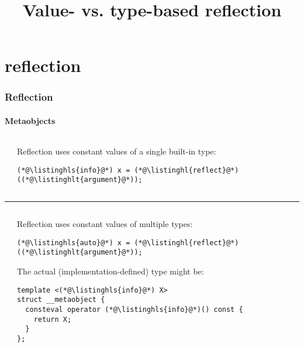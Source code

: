 \documentclass[compress,table,xcolor=table]{beamer}
\begin{document}
\title{Value- vs. type-based reflection}
\section{reflection}
\begin{frame}[fragile]
  \frametitle{Reflection}
  \framesubtitle{Metaobjects}
  \begin{columns}
    \begin{column}{.05\textwidth}
    \end{column}
    \begin{column}{.85\textwidth}
    \normalsize
    Reflection uses constant values of a single built-in type:
    \begin{lstlisting}[language=c++2x,basicstyle=\normalsize\ttfamily]
(*@\listinghls{info}@*) x = (*@\listinghl{reflect}@*)((*@\listinghlt{argument}@*));
    \end{lstlisting}
    \end{column}
  \end{columns}
  \vfill
  \hrule
  \vfill
  \begin{columns}
    \begin{column}{.05\textwidth}
    \end{column}
    \begin{column}{.85\textwidth}
    \normalsize
    Reflection uses constant values of multiple types:
    \begin{lstlisting}[language=c++2x,basicstyle=\normalsize\ttfamily]
(*@\listinghls{auto}@*) x = (*@\listinghl{reflect}@*)((*@\listinghlt{argument}@*));
    \end{lstlisting}
    The actual (implementation-defined) type might be:
    \begin{lstlisting}[language=c++2x,basicstyle=\footnotesize\ttfamily]
template <(*@\listinghls{info}@*) X>
struct __metaobject {
  consteval operator (*@\listinghls{info}@*)() const {
    return X;
  }
};
    \end{lstlisting}
    \end{column}
  \end{columns}
\end{frame}
\end{document}
